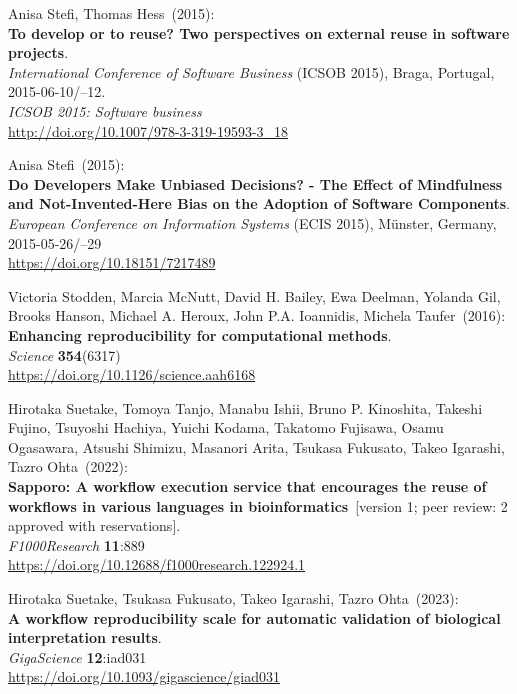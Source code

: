 \begin{thebibliography}{9}
Anisa Stefi, Thomas Hess~(2015): \\
\textbf{To develop or to reuse? Two perspectives on external reuse in software projects}. \\
\emph{International Conference of Software Business} (ICSOB 2015), Braga, Portugal, 2015-06-10/--12.\\
\emph{ICSOB 2015: Software business} \\
\url{http://doi.org/10.1007/978-3-319-19593-3_18}

Anisa Stefi~(2015): \\
\textbf{Do Developers Make Unbiased Decisions? - The Effect of Mindfulness and Not-Invented-Here Bias on the Adoption of Software Components}. \\
\emph{European Conference on Information Systems} (ECIS 2015), Münster, Germany, 2015-05-26/--29 \\
\url{https://doi.org/10.18151/7217489}

Victoria Stodden, Marcia McNutt, David H. Bailey, Ewa Deelman, Yolanda Gil, Brooks Hanson, Michael A. Heroux, John P.A. Ioannidis, Michela Taufer~(2016): \\
\textbf{Enhancing reproducibility for computational methods}.\\
\emph{Science} \textbf{354}(6317) \\
\url{https://doi.org/10.1126/science.aah6168}

Hirotaka Suetake, Tomoya Tanjo, Manabu Ishii, Bruno P. Kinoshita, Takeshi Fujino, Tsuyoshi Hachiya, Yuichi Kodama, Takatomo Fujisawa, Osamu Ogasawara, Atsushi Shimizu, Masanori Arita, Tsukasa Fukusato, Takeo Igarashi, Tazro Ohta~(2022): \\
\textbf{Sapporo: A workflow execution service that encourages the reuse of workflows in various languages in bioinformatics}~[version 1; peer review: 2 approved with reservations].\\
\emph{F1000Research} \textbf{11}:889\\
\url{https://doi.org/10.12688/f1000research.122924.1}

Hirotaka Suetake, Tsukasa Fukusato, Takeo Igarashi, Tazro Ohta~(2023): \\
\textbf{A workflow reproducibility scale for automatic validation of biological interpretation results}.\\
\emph{GigaScience} \textbf{12}:iad031\\
\url{https://doi.org/10.1093/gigascience/giad031}


\end{thebibliography}
